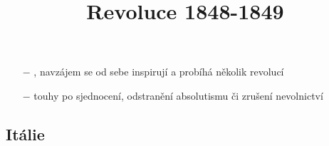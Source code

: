 \documentclass{article}
\title{\vspace{-2cm}Revoluce 1848-1849\vspace{-1.7cm}}
\date{}
\author{}
\begin{document}
\maketitle

\begin{itemize}
    \vspace{-0.5em}
    \setlength\itemsep{0.15em}
    \item[$-$] , navzájem se od sebe inspirují a probíhá několik revolucí
    \item[$-$] touhy po sjednocení, odstranění absolutismu či zrušení nevolnictví
\end{itemize}

\subsection*{Itálie}
\end{document}
